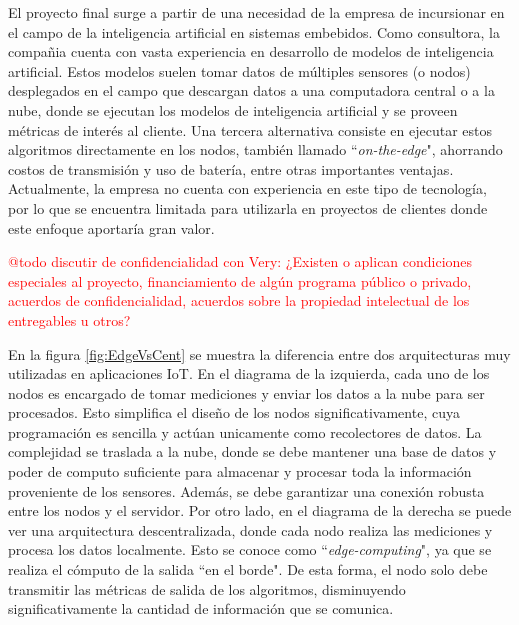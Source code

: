 \documentclass[
11pt, %
codirector, %
]{charter}
\begin{document}
El proyecto final surge a partir de una necesidad de la empresa \empclientename  de incursionar en el campo de la inteligencia artificial en sistemas embebidos. Como consultora, la compañia cuenta con vasta experiencia en desarrollo de modelos de inteligencia artificial. Estos modelos suelen tomar datos de múltiples sensores (o nodos) desplegados en el campo que descargan datos a una computadora central o a la nube, donde se ejecutan los modelos de inteligencia artificial y se proveen métricas de interés al cliente. Una tercera alternativa consiste en ejecutar estos algoritmos directamente en los nodos, también llamado ``\textit{on-the-edge}", ahorrando costos de transmisión y uso de batería, entre otras importantes ventajas. Actualmente, la empresa no cuenta con experiencia en este tipo de tecnología, por lo que se encuentra limitada para utilizarla en proyectos de clientes donde este enfoque aportaría gran valor.

\textcolor{red}{@todo discutir de confidencialidad con Very: ¿Existen o aplican condiciones especiales al proyecto, financiamiento de algún programa público o privado, acuerdos de confidencialidad, acuerdos sobre la propiedad intelectual de los entregables u otros?}

En la figura \ref{fig:EdgeVsCent} se muestra la diferencia entre dos arquitecturas muy utilizadas en aplicaciones IoT. En el diagrama de la izquierda, cada uno de los nodos es encargado de tomar mediciones y enviar los datos a la nube para ser procesados. Esto simplifica el diseño de los nodos significativamente, cuya programación es sencilla y actúan unicamente como recolectores de datos. La complejidad se traslada a la nube, donde se debe mantener una base de datos y poder de computo suficiente para almacenar y procesar toda la información proveniente de los sensores. Además, se debe garantizar una conexión robusta entre los nodos y el servidor. Por otro lado, en el diagrama de la derecha se puede ver una arquitectura descentralizada, donde cada nodo realiza las mediciones y procesa los datos localmente. Esto se conoce como ``\textit{edge-computing}", ya que se realiza el cómputo de la salida ``en el borde". De esta forma, el nodo solo debe transmitir las métricas de salida de los algoritmos, disminuyendo significativamente la cantidad de información que se comunica.
\end{document}
